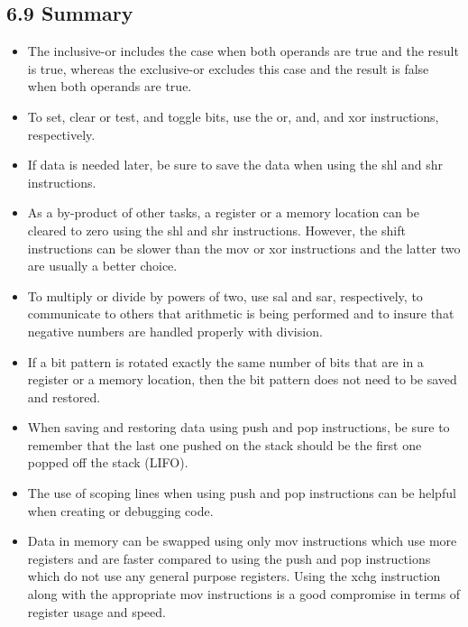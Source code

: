 \documentclass[10pt]{article}
\begin{document}
\subsection*{6.9 Summary}
\begin{itemize}
  \item The inclusive-or includes the case when both operands are true and the result is true, whereas the exclusive-or excludes this case and the result is false when both operands are true.
  \item To set, clear or test, and toggle bits, use the or, and, and xor instructions, respectively.
  \item If data is needed later, be sure to save the data when using the shl and shr instructions.
  \item As a by-product of other tasks, a register or a memory location can be cleared to zero using the shl and shr instructions. However, the shift instructions can be slower than the mov or xor instructions and the latter two are usually a better choice.
  \item To multiply or divide by powers of two, use sal and sar, respectively, to communicate to others that arithmetic is being performed and to insure that negative numbers are handled properly with division.
  \item If a bit pattern is rotated exactly the same number of bits that are in a register or a memory location, then the bit pattern does not need to be saved and restored.
  \item When saving and restoring data using push and pop instructions, be sure to remember that the last one pushed on the stack should be the first one popped off the stack (LIFO).
  \item The use of scoping lines when using push and pop instructions can be helpful when creating or debugging code.
  \item Data in memory can be swapped using only mov instructions which use more registers and are faster compared to using the push and pop instructions which do not use any general purpose registers. Using the xchg instruction along with the appropriate mov instructions is a good compromise in terms of register usage and speed.
\end{itemize}
\end{document}
